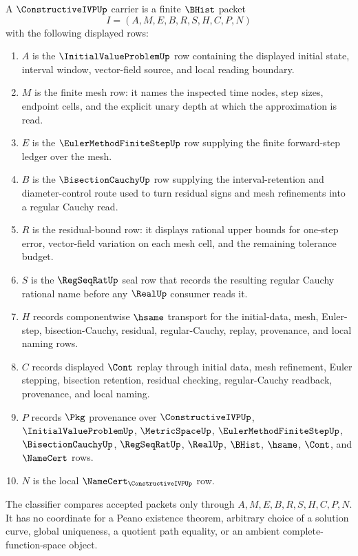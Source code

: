\begin{definition}
\label{def:constructive-ivp-carrier}
A $\ConstructiveIVPUp$ carrier is a finite $\BHist$ packet
$$
I=(A,M,E,B,R,S,H,C,P,N)
$$
with the following displayed rows:
\begin{enumerate}
\item $A$ is the $\InitialValueProblemUp$ row containing the displayed initial state, interval window, vector-field source, and local reading boundary.
\item $M$ is the finite mesh row: it names the inspected time nodes, step sizes, endpoint cells, and the explicit unary depth at which the approximation is read.
\item $E$ is the $\EulerMethodFiniteStepUp$ row supplying the finite forward-step ledger over the mesh.
\item $B$ is the $\BisectionCauchyUp$ row supplying the interval-retention and diameter-control route used to turn residual signs and mesh refinements into a regular Cauchy read.
\item $R$ is the residual-bound row: it displays rational upper bounds for one-step error, vector-field variation on each mesh cell, and the remaining tolerance budget.
\item $S$ is the $\RegSeqRatUp$ seal row that records the resulting regular Cauchy rational name before any $\RealUp$ consumer reads it.
\item $H$ records componentwise $\hsame$ transport for the initial-data, mesh, Euler-step, bisection-Cauchy, residual, regular-Cauchy, replay, provenance, and local naming rows.
\item $C$ records displayed $\Cont$ replay through initial data, mesh refinement, Euler stepping, bisection retention, residual checking, regular-Cauchy readback, provenance, and local naming.
\item $P$ records $\Pkg$ provenance over $\ConstructiveIVPUp$, $\InitialValueProblemUp$, $\MetricSpaceUp$, $\EulerMethodFiniteStepUp$, $\BisectionCauchyUp$, $\RegSeqRatUp$, $\RealUp$, $\BHist$, $\hsame$, $\Cont$, and $\NameCert$ rows.
\item $N$ is the local $\NameCert_{\ConstructiveIVPUp}$ row.
\end{enumerate}
The classifier compares accepted packets only through $A,M,E,B,R,S,H,C,P,N$. It has no coordinate for a Peano existence theorem, arbitrary choice of a solution curve, global uniqueness, a quotient path equality, or an ambient complete-function-space object.
\end{definition}

